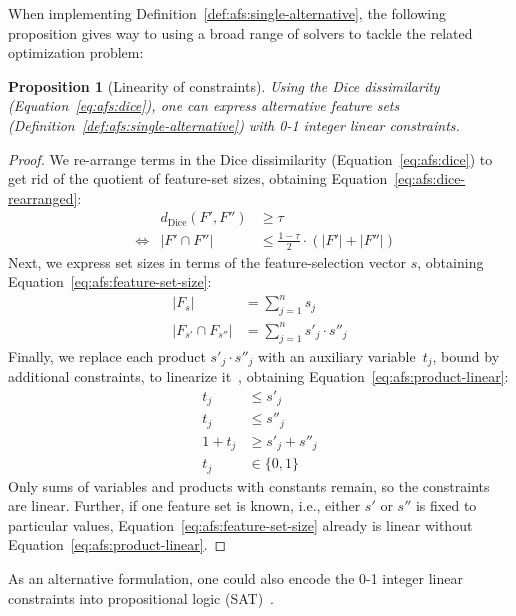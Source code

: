 \documentclass[iicol, sn-basic, Numbered]{sn-jnl} %
\theoremstyle{plain}
\newtheorem{proposition}{Proposition}
\theoremstyle{definition}
\begin{document}
When implementing Definition~\ref{def:afs:single-alternative}, the following proposition gives way to using a broad range of solvers to tackle the related optimization problem:
%
\begin{proposition}[Linearity of constraints]
	Using the Dice dissimilarity (Equation~\ref{eq:afs:dice}), one can express alternative feature sets (Definition~\ref{def:afs:single-alternative}) with 0-1 integer linear constraints.
	\label{prop:afs:linear-constraints}
\end{proposition}
%
\begin{proof}
We re-arrange terms in the Dice dissimilarity (Equation~\ref{eq:afs:dice}) to get rid of the quotient of feature-set sizes, obtaining Equation~\ref{eq:afs:dice-rearranged}:
%
\begin{equation}
	\begin{aligned}
		& & d_{\text{Dice}}(F',F'') & \geq \tau \\
		& \Leftrightarrow & |F' \cap F''| & \leq \frac{1 - \tau}{2} \cdot (|F'| + |F''|)
	\end{aligned}
	\label{eq:afs:dice-rearranged}
\end{equation}
%
Next, we express set sizes in terms of the feature-selection vector $s$, obtaining Equation~\ref{eq:afs:feature-set-size}:
%
\begin{equation}
	\begin{aligned}
		|F_s| & = \sum_{j=1}^n s_j \\
		|F_{s'} \cap F_{s''}| & = \sum_{j=1}^n s'_j \cdot s''_j
	\end{aligned}
	\label{eq:afs:feature-set-size}
\end{equation}
%
Finally, we replace each product $s'_j \cdot s''_j$ with an auxiliary variable~$t_j$, bound by additional constraints, to linearize it~\cite{mosek2022modeling}, obtaining Equation~\ref{eq:afs:product-linear}:
%
\begin{equation}
	\begin{aligned}
		t_j & \leq s'_j \\
		t_j & \leq s''_j \\
		1 + t_j & \geq s'_j + s''_j \\
		t_j & \in \{0,1\}
	\end{aligned}
	\label{eq:afs:product-linear}
\end{equation}
%
Only sums of variables and products with constants remain, so the constraints are linear.
Further, if one feature set is known, i.e., either $s'$ or $s''$ is fixed to particular values, Equation~\ref{eq:afs:feature-set-size} already is linear without Equation~\ref{eq:afs:product-linear}.
\end{proof}
%
As an alternative formulation, one could also encode the 0-1 integer linear constraints into propositional logic (\textsc{SAT})~\cite{ulrich2022selecting}.
\end{document}
